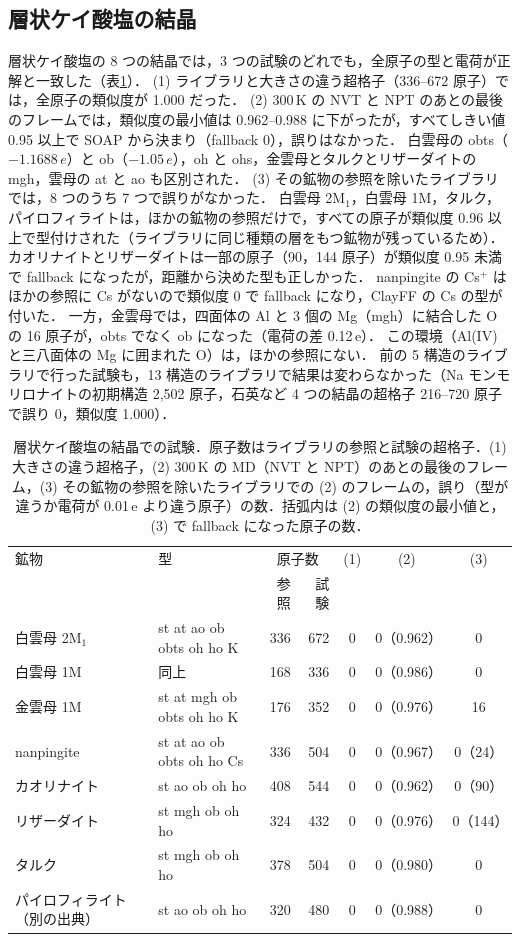 \documentclass[a4paper,11pt]{article}
\newcommand{\e}{\,e}
\begin{document}
\subsection{層状ケイ酸塩の結晶}
\label{sec:ressheet}
層状ケイ酸塩の 8 つの結晶では，3 つの試験のどれでも，全原子の型と電荷が正解と一致した（表\ref{tab:sheet}）．
(1) ライブラリと大きさの違う超格子（336--672 原子）では，全原子の類似度が 1.000 だった．
(2) 300\,K の NVT と NPT のあとの最後のフレームでは，類似度の最小値は 0.962--0.988 に下がったが，すべてしきい値 0.95 以上で SOAP から決まり（fallback 0），誤りはなかった．
白雲母の obts（$-1.1688\e$）と ob（$-1.05\e$），oh と ohs，金雲母とタルクとリザーダイトの mgh，雲母の at と ao も区別された．
(3) その鉱物の参照を除いたライブラリでは，8 つのうち 7 つで誤りがなかった．
白雲母 2M$_1$，白雲母 1M，タルク，パイロフィライトは，ほかの鉱物の参照だけで，すべての原子が類似度 0.96 以上で型付けされた（ライブラリに同じ種類の層をもつ鉱物が残っているため）．
カオリナイトとリザーダイトは一部の原子（90，144 原子）が類似度 0.95 未満で fallback になったが，距離から決めた型も正しかった．
nanpingite の Cs$^+$ はほかの参照に Cs がないので類似度 0 で fallback になり，ClayFF の Cs の型が付いた．
一方，金雲母では，四面体の Al と 3 個の Mg（mgh）に結合した O の 16 原子が，obts でなく ob になった（電荷の差 0.12\e）．
この環境（Al(IV) と三八面体の Mg に囲まれた O）は，ほかの参照にない．
前の 5 構造のライブラリで行った試験も，13 構造のライブラリで結果は変わらなかった（Na モンモリロナイトの初期構造 2{,}502 原子，石英など 4 つの結晶の超格子 216--720 原子で誤り 0，類似度 1.000）．

\begin{table}[!htbp]
\centering
\caption{層状ケイ酸塩の結晶での試験．原子数はライブラリの参照と試験の超格子．(1) 大きさの違う超格子，(2) 300\,K の MD（NVT と NPT）のあとの最後のフレーム，(3) その鉱物の参照を除いたライブラリでの (2) のフレームの，誤り（型が違うか電荷が 0.01\e{} より違う原子）の数．括弧内は (2) の類似度の最小値と，(3) で fallback になった原子の数．}
\label{tab:sheet}
\small
\begin{tabular}{llrrccc}
\toprule
鉱物 & 型 & \multicolumn{2}{c}{原子数} & (1) & (2) & (3) \\
 & & 参照 & 試験 & & & \\
\midrule
白雲母 2M$_1$ & st at ao ob obts oh ho K & 336 & 672 & 0 & 0（0.962） & 0 \\
白雲母 1M & 同上 & 168 & 336 & 0 & 0（0.986） & 0 \\
金雲母 1M & st at mgh ob obts oh ho K & 176 & 352 & 0 & 0（0.976） & 16 \\
nanpingite & st at ao ob obts oh ho Cs & 336 & 504 & 0 & 0（0.967） & 0（24） \\
カオリナイト & st ao ob oh ho & 408 & 544 & 0 & 0（0.962） & 0（90） \\
リザーダイト & st mgh ob oh ho & 324 & 432 & 0 & 0（0.976） & 0（144） \\
タルク & st mgh ob oh ho & 378 & 504 & 0 & 0（0.980） & 0 \\
パイロフィライト（別の出典） & st ao ob oh ho & 320 & 480 & 0 & 0（0.988） & 0 \\
\bottomrule
\end{tabular}
\end{table}
\end{document}
